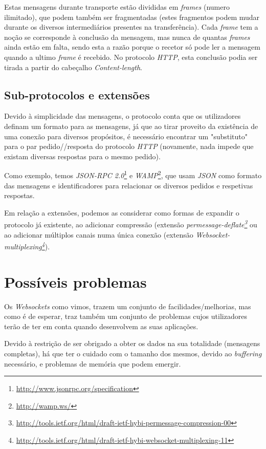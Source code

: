 \documentclass[a4paper]{article}
\begin{document}
Estas mensagens durante transporte estão divididas em \emph{frames} (numero ilimitado), que podem também ser fragmentadas (estes fragmentos podem mudar durante os diversos intermediários presentes na transferência). Cada \emph{frame} tem a noção se corresponde à conclusão da mensagem, mas nunca de quantas \emph{frames} ainda estão em falta, sendo esta a razão porque o recetor só pode ler a mensagem quando a ultimo \emph{frame} é recebido. No protocolo \emph{HTTP}, esta conclusão podia ser tirada a partir do cabeçalho \emph{Content-length}. 

\subsection{Sub-protocolos e extensões}

Devido à simplicidade das mensagens, o protocolo conta que os utilizadores definam um formato para as mensagens, já que ao tirar proveito da existência de uma conexão para diversos propósitos, é necessário encontrar um "substituto" para o par pedido//resposta do protocolo \emph{HTTP} (novamente, nada impede que existam diversas respostas para o mesmo pedido). 

Como exemplo, temos \emph{JSON-RPC 2.0}\footnote{\url{http://www.jsonrpc.org/specification}} e \emph{WAMP}\footnote{\url{http://wamp.ws/}}, que usam \emph{JSON} como formato das mensagens e identificadores para relacionar os diversos pedidos e respetivas respostas.

\medskip

Em relação a extensões, podemos as considerar como formas de expandir o protocolo já existente, ao adicionar compressão (extensão \emph{permessage-deflate\footnote{\url{http://tools.ietf.org/html/draft-ietf-hybi-permessage-compression-00}}} ou ao adicionar múltiplos canais numa única conexão (extensão \emph{Websocket-multiplexing\footnote{\url{http://tools.ietf.org/html/draft-ietf-hybi-websocket-multiplexing-11}}}). 

\section{Possíveis problemas}

Os \emph{Websockets} como vimos, trazem um conjunto de facilidades/melhorias, mas como é de esperar, traz também um conjunto de problemas cujos utilizadores terão de ter em conta quando desenvolvem as suas aplicações.

Devido à restrição de ser obrigado a obter os dados na sua totalidade (mensagens completas), há que ter o cuidado com o tamanho dos mesmos, devido ao \emph{buffering} necessário, e problemas de memória que podem emergir.
\end{document}
